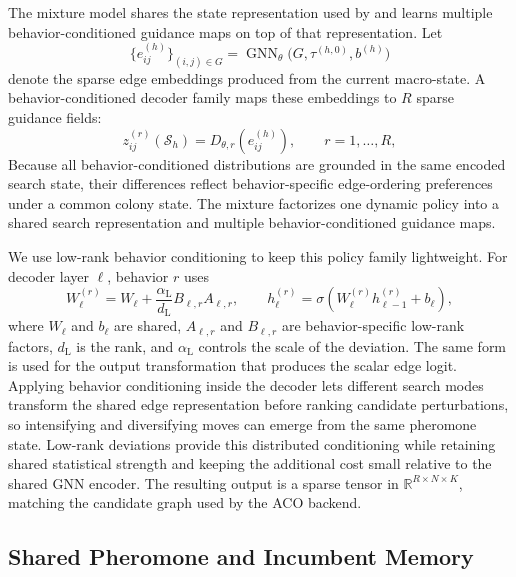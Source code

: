 The mixture model shares the state representation used by \DyNACO{} and learns multiple behavior-conditioned guidance maps on top of that representation. Let
\begin{equation}
\{e_{ij}^{(h)}\}_{(i,j)\in G}
=
\operatorname{GNN}_{\theta}
\bigl(G,\tau^{(h,0)},b^{(h)}\bigr)
\end{equation}
denote the sparse edge embeddings produced from the current macro-state. A behavior-conditioned decoder family maps these embeddings to $R$ sparse guidance fields:
\begin{equation}
z_{ij}^{(r)}(\mathcal{S}_h)
= D_{\theta,r}(e_{ij}^{(h)}),
\qquad r=1,\ldots,R,
\label{eq:multi-trajectory-logit}
\end{equation}
Because all behavior-conditioned distributions are grounded in the same encoded search state, their differences reflect behavior-specific edge-ordering preferences under a common colony state. The mixture factorizes one dynamic policy into a shared search representation and multiple behavior-conditioned guidance maps.

We use low-rank behavior conditioning to keep this policy family lightweight. For decoder layer $\ell$, behavior $r$ uses
\begin{equation}
W_{\ell}^{(r)}
= W_{\ell}
+ \frac{\alpha_{\mathrm{L}}}{d_{\mathrm{L}}}B_{\ell,r}A_{\ell,r},
\qquad
h_{\ell}^{(r)}
= \sigma\!\left(W_{\ell}^{(r)}h_{\ell-1}^{(r)}+b_{\ell}\right),
\label{eq:behavior-decoder}
\end{equation}
where $W_{\ell}$ and $b_{\ell}$ are shared, $A_{\ell,r}$ and $B_{\ell,r}$ are behavior-specific low-rank factors, $d_{\mathrm{L}}$ is the rank, and $\alpha_{\mathrm{L}}$ controls the scale of the deviation. The same form is used for the output transformation that produces the scalar edge logit. Applying behavior conditioning inside the decoder lets different search modes transform the shared edge representation before ranking candidate perturbations, so intensifying and diversifying moves can emerge from the same pheromone state. Low-rank deviations provide this distributed conditioning while retaining shared statistical strength and keeping the additional cost small relative to the shared GNN encoder. The resulting output is a sparse tensor in $\mathbb{R}^{R\times N\times K}$, matching the candidate graph used by the ACO backend.

\subsection{Shared Pheromone and Incumbent Memory}
\label{sec:tdg-shared-colony}


